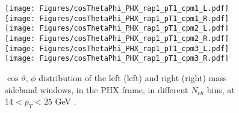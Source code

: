 \documentclass[12pt]{article}
\newcommand{\pt}{$p_{\mathrm{T}}$}
\begin{document}
%
%


\begin{figure}[htbp]
\centering
\texttt{[image: Figures/cosThetaPhi\_PHX\_rap1\_pT1\_cpm1\_L.pdf]}
\texttt{[image: Figures/cosThetaPhi\_PHX\_rap1\_pT1\_cpm1\_R.pdf]}
\texttt{[image: Figures/cosThetaPhi\_PHX\_rap1\_pT1\_cpm2\_L.pdf]}
\texttt{[image: Figures/cosThetaPhi\_PHX\_rap1\_pT1\_cpm2\_R.pdf]}
\texttt{[image: Figures/cosThetaPhi\_PHX\_rap1\_pT1\_cpm3\_L.pdf]}
\texttt{[image: Figures/cosThetaPhi\_PHX\_rap1\_pT1\_cpm3\_R.pdf]}
\caption{$\cos\vartheta,\,\phi$ distribution of the left (left) and
  right (right) mass sideband windows, in the PHX frame, in different
  $N_{ch}$ bins, at $14 < p_{T} < 25$ GeV .}
\end{figure}
\clearpage
\end{document}
